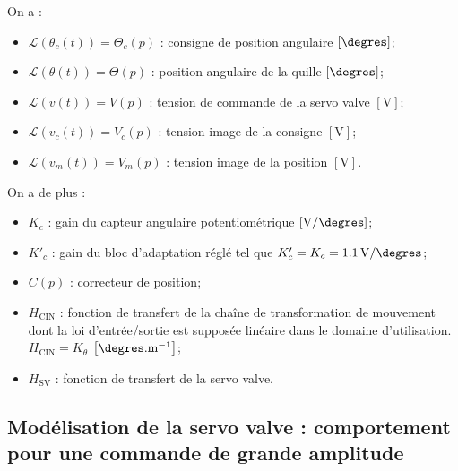 \documentclass[10pt,fleqn]{article} %
\begin{document}
\begin{multicols}{2}
\begin{center}
\end{center}

\normalsize


On a :
\begin{itemize}
\item $\mathcal{L}\left(\theta_c(t)\right)=\Theta_c(p)$ : consigne de position angulaire $\left[\degres\right]$;
\item $\mathcal{L}\left(\theta(t)\right)=\Theta(p)$ : position angulaire de la quille $\left[\degres\right]$;
\item $\mathcal{L}\left(v(t)\right)=V(p)$ : tension de commande de la servo valve $\left[\text{V}\right]$;
\item $\mathcal{L}\left(v_c(t)\right)=V_c(p)$ : tension image de la consigne $\left[\text{V}\right]$;
\item $\mathcal{L}\left(v_m(t)\right)=V_m(p)$ : tension image de la position $\left[\text{V}\right]$.
\end{itemize}

On a de plus :
\begin{itemize}
\item $K_c$ : gain du capteur angulaire potentiométrique $\left[\text{V}/\degres\right]$;
\item $K'_c$ : gain du bloc d'adaptation réglé tel que $K'_c=K_c=\SI{1,1}{V/\degres}$;
\item $C(p)$ : correcteur de position;
\item $H_{\text{CIN}}$ : fonction de transfert de la chaîne de transformation de mouvement dont la loi
d’entrée/sortie est supposée linéaire dans le domaine d’utilisation. $H_{\text{CIN}}=K_{\theta}$ $\left[\degres.\text{m}^{-1}\right]$;
\item $H_{\text{SV}}$ : fonction de transfert de la servo valve.
\end{itemize}

\fi

\subsection*{Modélisation de la servo valve : comportement pour une commande de grande amplitude}


\end{multicols}
\end{document}
